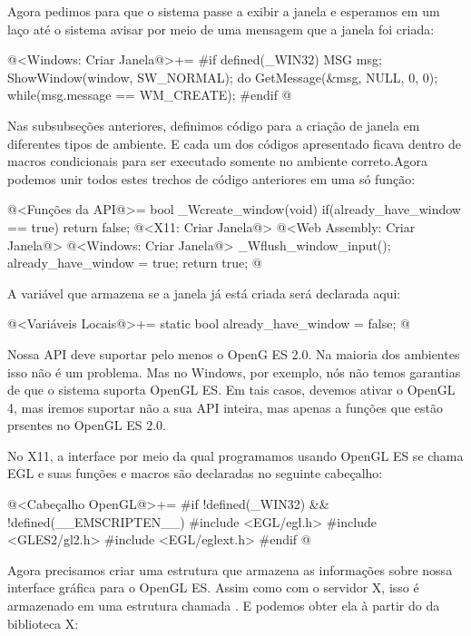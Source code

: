Agora pedimos para que o sistema passe a exibir a janela e esperamos
em um laço até o sistema avisar por meio de uma mensagem que a janela
foi criada:

\iniciocodigo
@<Windows: Criar Janela@>+=
#if defined(_WIN32)
{
  MSG msg;
  ShowWindow(window, SW_NORMAL);
  do{
    GetMessage(&msg, NULL, 0, 0);
  } while(msg.message == WM_CREATE);
}
#endif
@
\fimcodigo


Nas subsubseções anteriores, definimos código para a criação de janela
em diferentes tipos de ambiente. E cada um dos códigos apresentado
ficava dentro de macros condicionais para ser executado somente no
ambiente correto.Agora podemos unir todos estes trechos de código
anteriores em uma só função:

\iniciocodigo
@<Funções da API@>=
bool _Wcreate_window(void){
  if(already_have_window == true)
    return false;
  @<X11: Criar Janela@>
  @<Web Assembly: Criar Janela@>
  @<Windows: Criar Janela@>
  _Wflush_window_input();
  already_have_window = true;
  return true;
}
@
\fimcodigo

A variável que armazena se a janela já está criada será declarada
aqui:

\iniciocodigo
@<Variáveis Locais@>+=
static bool already_have_window = false;
@
\fimcodigo


Nossa API deve suportar pelo menos o OpenG ES 2.0. Na maioria dos
ambientes isso não é um problema. Mas no Windows, por exemplo, nós não
temos garantias de que o sistema suporta OpenGL ES. Em tais casos,
devemos ativar o OpenGL 4, mas iremos suportar não a sua API inteira,
mas apenas a funções que estão prsentes no OpenGL ES 2.0.


No X11, a interface por meio da qual programamos usando OpenGL ES se
chama EGL e suas funções e macros são declaradas no seguinte
cabeçalho:

\iniciocodigo
@<Cabeçalho OpenGL@>+=
#if !defined(_WIN32) && !defined(__EMSCRIPTEN__)
#include <EGL/egl.h>
#include <GLES2/gl2.h>
#include <EGL/eglext.h>
#endif
@
\fimcodigo

Agora precisamos criar uma estrutura que armazena as informações sobre
nossa interface gráfica para o OpenGL ES. Assim como com o servidor X,
isso é armazenado em uma estrutura chamada . E
podemos obter ela à partir do  da biblioteca X:


